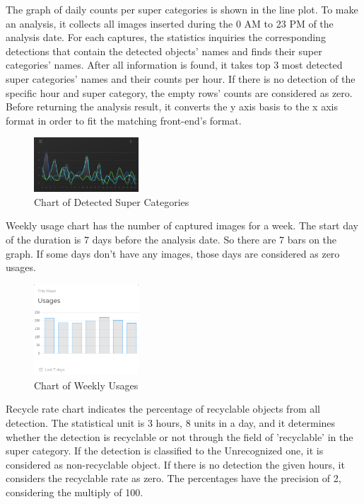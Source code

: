 \documentclass[conference]{IEEEtran}
\begin{document}
The graph of daily counts per super categories is shown in the line plot. To make an analysis, it collects all images inserted during the 0 AM to 23 PM of the analysis date. For each captures, the statistics inquiries the corresponding detections that contain the detected objects' names and finds their super categories' names. After all information is found, it takes top 3 most detected super categories' names and their counts per hour. If there is no detection of the specific hour and super category, the empty rows' counts are considered as zero. Before returning the analysis result, it converts the y axis basis to the x axis format in order to fit the matching front-end's format.\\

\begin{figure}[h]
    \centering
    \includegraphics[width=0.35\textwidth]{images/dashboard_day_cnt_chart.eps}
    \caption{Chart of Detected Super Categories}
\end{figure}

Weekly usage chart has the number of captured images for a week. The start day of the duration is 7 days before the analysis date. So there are 7 bars on the graph. If some days don't have any images, those days are considered as zero usages.\\

\begin{figure}[h]
    \centering
    \includegraphics[width=0.35\textwidth]{images/dashboard_week_usage_chart.eps}
    \caption{Chart of Weekly Usages}
\end{figure}

Recycle rate chart indicates the percentage of recyclable objects from all detection. The statistical unit is 3 hours, 8 units in a day, and it determines whether the detection is recyclable or not through the field of 'recyclable' in the super category. If the detection is classified to the Unrecognized one, it is considered as non-recyclable object. If there is no detection the given hours, it considers the recyclable rate as zero. The percentages have the precision of 2, considering the multiply of 100.\\
\end{document}
